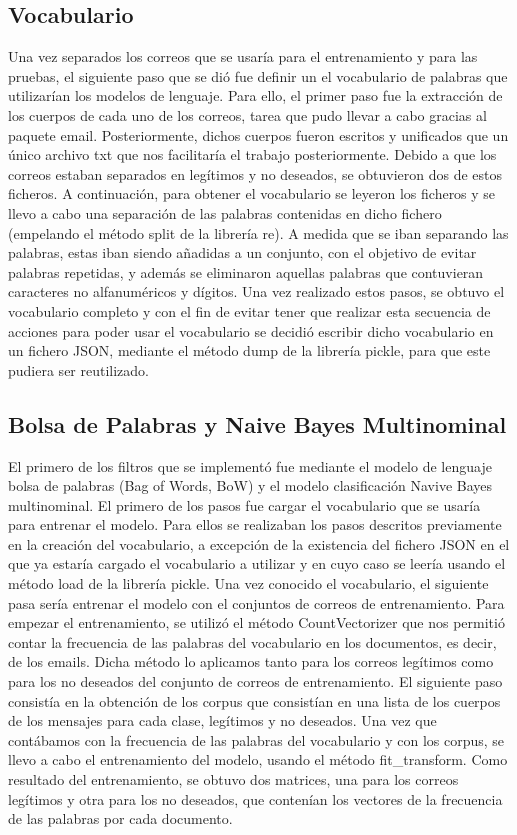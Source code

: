 \documentclass[conference,a4paper]{IEEEtran}
\begin{document}
\subsection{Vocabulario}
Una vez separados los correos que se usaría para el entrenamiento y para las pruebas, el siguiente paso que se dió fue definir un el vocabulario de palabras que  utilizarían los modelos de lenguaje. Para ello, el primer paso fue la extracción de los cuerpos de cada uno de los correos, tarea que pudo llevar a cabo gracias al paquete email. Posteriormente, dichos cuerpos fueron escritos y unificados que un único archivo txt que nos facilitaría el trabajo posteriormente. Debido a que los correos estaban separados en legítimos y no deseados, se obtuvieron dos de estos ficheros. A continuación, para obtener el vocabulario se leyeron los ficheros y se llevo a cabo una separación de las palabras contenidas en dicho fichero (empelando el método split de la librería re). A medida que se iban separando las palabras, estas iban siendo añadidas a un conjunto, con el objetivo de evitar palabras repetidas, y además se eliminaron aquellas palabras que contuvieran caracteres no alfanuméricos y dígitos. Una vez realizado estos pasos, se obtuvo el vocabulario completo y con el fin de evitar tener que realizar esta secuencia de acciones para poder usar el vocabulario se decidió escribir dicho vocabulario en un fichero JSON, mediante el método dump de la librería pickle, para que este pudiera ser reutilizado.



\subsection{Bolsa de Palabras y Naive Bayes Multinominal}

El primero de los filtros que se implementó fue mediante el modelo de lenguaje bolsa de palabras (Bag of Words, BoW) y el modelo clasificación Navive Bayes multinominal. El primero de los pasos fue cargar el vocabulario que se usaría para entrenar el modelo. Para ellos se realizaban los pasos descritos previamente en la creación del vocabulario, a excepción de la existencia del fichero JSON en el que ya estaría cargado el vocabulario a utilizar y en cuyo caso se leería usando el método load de la librería pickle. Una vez conocido el vocabulario, el siguiente pasa sería entrenar el modelo con el conjuntos de correos de entrenamiento. Para empezar el entrenamiento, se utilizó el método CountVectorizer que nos permitió contar la frecuencia de las palabras del vocabulario en los documentos, es decir, de los emails. Dicha método lo aplicamos tanto para los correos legítimos como para los no deseados del conjunto de correos de entrenamiento. El siguiente paso consistía en la obtención de los corpus que consistían en una lista de los cuerpos de los mensajes para cada clase, legítimos y no deseados. Una vez que contábamos con la frecuencia de las palabras del vocabulario y con los corpus, se llevo a cabo el entrenamiento del modelo, usando el método fit\_transform. Como resultado del entrenamiento, se obtuvo dos matrices, una para los correos legítimos y otra para los no deseados, que contenían los vectores de la frecuencia de las palabras por cada documento.
\end{document}
